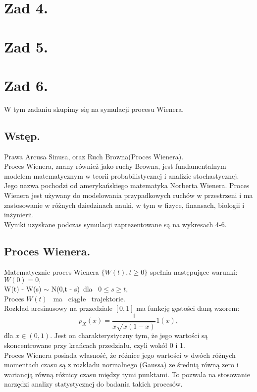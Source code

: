 \documentclass[12pt,letterpaper]{article}
\theoremstyle{definition}
\begin{document}
\section{Zad 4.}
\section{Zad 5.}
\section{Zad 6.}
W tym zadaniu skupimy się na symulacji procesu Wienera.

\subsection{Wstęp.}
Prawa Arcusa Sinusa, oraz Ruch Browna(Proces Wienera). \\

Proces Wienera, znany również jako ruchy Browna, jest fundamentalnym modelem matematycznym w teorii probabilistycznej i analizie stochastycznej. Jego nazwa pochodzi od amerykańskiego matematyka Norberta Wienera. Proces Wienera jest używany do modelowania przypadkowych ruchów w przestrzeni i ma zastosowanie w różnych dziedzinach nauki, w tym w fizyce, finansach, biologii i inżynierii.\\

Wyniki uzyskane podczas symulacji zaprezentowane są na wykresach 4-6.

\subsection{Proces Wienera.}
Matematycznie proces Wienera $\{ W(t),t\geq 0 \}$ spełnia następujące warunki:\\

$W(0)=0,$\\
W(t) - W(s) $\sim$ N(0,t - s)\  dla \ $0\leq s \geq t,$\\
Proces $ W(t)$ \ ma \ ciągłe \ trajektorie.\\

Rozkład arcsinusowy na przzedziale $[0,1]$ ma funkcję gęstości daną wzorem:
$$p_X(x)=\frac{1}{x\sqrt{x(1-x)}}  \mathit{1} (x) ,$$
dla $x \in (0,1).$ Jest on charakterystyczny tym, że jego wartości są skoncentrowane przy krańcach przedziału, czyli wokół 0 i 1.\\

 Proces Wienera posiada własność, że różnice jego wartości w dwóch różnych momentach czasu są z rozkładu normalnego (Gaussa) ze średnią równą zero i wariancją równą różnicy czasu między tymi punktami. To pozwala na stosowanie narzędzi analizy statystycznej do badania takich procesów.
\end{document}

